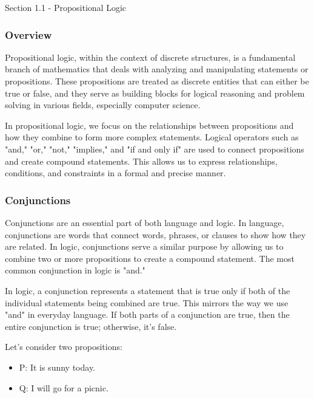 \begin{notes}{Section 1.1 - Propositional Logic}

    \subsubsection*{Overview}

    Propositional logic, within the context of discrete structures, is a fundamental branch of mathematics that deals with analyzing and manipulating statements or propositions. These propositions are 
    treated as discrete entities that can either be true or false, and they serve as building blocks for logical reasoning and problem solving in various fields, especially computer science.

    In propositional logic, we focus on the relationships between propositions and how they combine to form more complex statements. Logical operators such as "and," "or," "not," "implies," and "if and 
    only if" are used to connect propositions and create compound statements. This allows us to express relationships, conditions, and constraints in a formal and precise manner.

    \subsubsection*{Conjunctions}

    Conjunctions are an essential part of both language and logic. In language, conjunctions are words that connect words, phrases, or clauses to show how they are related. In logic, conjunctions serve 
    a similar purpose by allowing us to combine two or more propositions to create a compound statement. The most common conjunction in logic is "and."

    In logic, a conjunction represents a statement that is true only if both of the individual statements being combined are true. This mirrors the way we use "and" in everyday language. If both parts of a 
    conjunction are true, then the entire conjunction is true; otherwise, it's false.

    \begin{highlight}
        Let's consider two propositions:

        \begin{itemize}
            \item P: It is sunny today.
            \item Q: I will go for a picnic.
        \end{itemize}


\end{highlight}
\end{notes}
